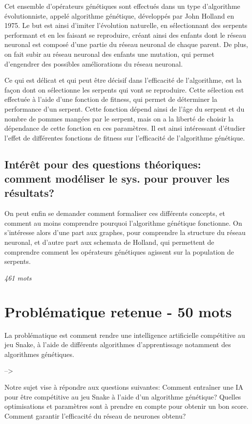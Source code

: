 \documentclass[11pt,a4paper]{article}
\begin{document}
Cet ensemble d'opérateurs génétiques sont effectués dans un type d'algorithme évolutionniste, appelé algorithme génétique, développés par John Holland en 1975.
Le but est ainsi d'imiter l'évolution naturelle, en sélectionnant des serpents performant et en les faisant se reproduire, créant ainsi des enfants dont le réseau neuronal est composé d'une partie du réseau neuronal de chaque parent.
De plus, on fait subir au réseau neuronal des enfants une mutation, qui permet d'engendrer des possibles améliorations du réseau neuronal.

Ce qui est délicat et qui peut être décisif dans l'efficacité de l'algorithme, est la façon dont on sélectionne les serpents qui vont se reproduire.
Cette sélection est effectuée à l'aide d'une fonction de fitness, qui permet de déterminer la performance d'un serpent.
Cette fonction dépend ainsi de l'âge du serpent et du nombre de pommes mangées par le serpent, mais on a la liberté de choisir la dépendance de cette fonction en ces paramètres.
Il est ainsi intéressant d'étudier l'effet de différentes fonctions de fitness sur l'efficacité de l'algorithme génétique.

\subsection{Intérêt pour des questions théoriques: comment modéliser le sys. pour prouver les résultats?}

On peut enfin se demander comment formaliser ces différents concepts, et comment au moins comprendre pourquoi l'algorithme génétique fonctionne.
On s'intéresse alors d'une part aux graphes, pour comprendre la structure du réseau neuronal, et d'autre part aux schemata de Holland, qui permettent de comprendre comment les opérateurs génétiques agissent sur la population de serpents.

\textit{461 mots}

\section{Problématique retenue - 50 mots}

La problématique est comment rendre une intelligence artificielle compétitive au jeu Snake, à l'aide de différents algorithmes d'apprentissage notamment des algorithmes génétiques.

--> 

Notre sujet vise à répondre aux questions suivantes:
Comment entraîner une IA pour être compétitive au jeu Snake à l'aide d'un algorithme génétique?
Quelles optimisations et paramètres sont à prendre en compte pour obtenir un bon score.
Comment garantir l'efficacité du réseau de neurones obtenu?
\end{document}
